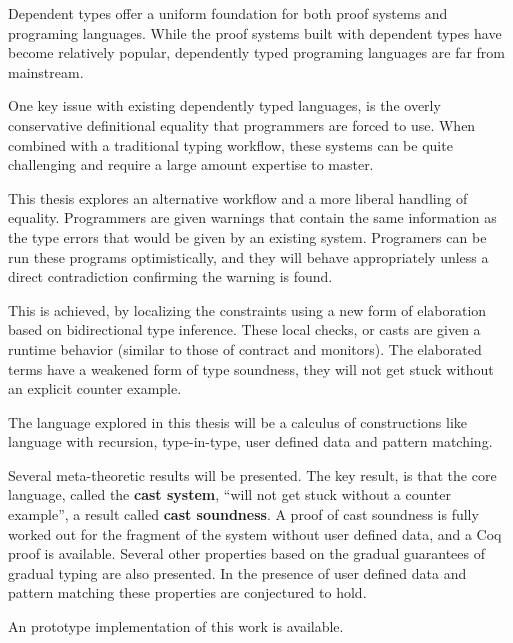 Dependent types offer a uniform foundation for both proof systems and programing languages.
While the proof systems built with dependent types have become relatively popular, dependently typed programing languages are far from mainstream. 

One key issue with existing dependently typed languages, is the overly conservative definitional equality that programmers are forced to use.
When combined with a traditional typing workflow, these systems can be quite challenging and require a large amount expertise to master.

This thesis explores an alternative workflow and a more liberal handling of equality.
Programmers are given warnings that contain the same information as the type errors that would be given by an existing system.
Programers can be run these programs optimistically, and they will behave appropriately unless a direct contradiction confirming the warning is found.

This is achieved, by localizing the constraints using a new form of elaboration based on bidirectional type inference.
These local checks, or casts are given a runtime behavior (similar to those of contract and monitors).
The elaborated terms have a weakened form of type soundness, they will not get stuck without an explicit counter example.

The language explored in this thesis will be a calculus of constructions like language with recursion, type-in-type, user defined data and pattern matching. 

Several meta-theoretic results will be presented.
The key result, is that the core language, called the \textbf{cast system}, ``will not get stuck without a counter example'', a result called \textbf{cast soundness}.
A proof of cast soundness is fully worked out for the fragment of the system without user defined data, and a Coq proof is available. Several other properties based on the gradual guarantees of gradual typing are also presented.
In the presence of user defined data and pattern matching these properties are conjectured to hold.

An prototype implementation of this work is available.

